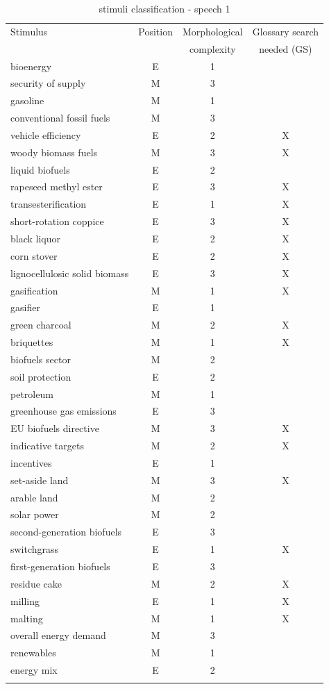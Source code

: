 \documentclass[output=paper]{langsci/langscibook}
\begin{document}
\begin{table}\footnotesize
	\caption{stimuli classification - speech 1\label{tab:prandi:1}}
\begin{tabularx}{\linewidth}{Xccc}
\lsptoprule
{Stimulus} & {Position} & {Morphological} & {Glossary search}\\
		   &            &  complexity      & needed (GS)\\\midrule
bioenergy & E & 1 & \\
security of supply & M & 3 & \\
gasoline & M & 1 & \\
conventional fossil fuels & M & 3 & \\
vehicle efficiency & E & 2 & X\\
woody biomass fuels & M & 3 & X\\
liquid biofuels & E & 2 & \\
rapeseed methyl ester & E & 3 & X\\
transesterification & E & 1 & X\\
short-rotation coppice & E & 3 & X\\
black liquor & E & 2 & X\\
corn stover & E & 2 & X\\
lignocellulosic solid biomass & E & 3 & X\\
gasification & M & 1 & X\\
gasifier & E & 1 & \\
green charcoal & M & 2 & X\\
briquettes & M & 1 & X\\
biofuels sector & M & 2 & \\
soil protection & E & 2 & \\
petroleum & M & 1 & \\
greenhouse gas emissions & E & 3 & \\
EU biofuels directive & M & 3 & X\\
indicative targets & M & 2 & X\\
incentives & E & 1 & \\
set-aside land & M & 3 & X\\
arable land & M & 2 & \\
solar power & M & 2 & \\
second-generation biofuels & E & 3 & \\
switchgrass & E & 1 & X\\
first-generation biofuels & E & 3 & \\
residue cake & M & 2 & X\\
milling & E & 1 & X\\
malting & M & 1 & X\\
overall energy demand & M & 3 & \\
renewables & M & 1 & \\
energy mix & E & 2 & \\
\lspbottomrule
\end{tabularx}
\end{table}
\end{document}
